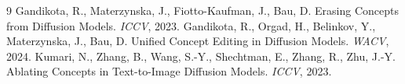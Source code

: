 \documentclass[10pt,twocolumn]{article}
\begin{document}
\begin{thebibliography}{9}
\small
\setlength{\itemsep}{0pt}
\setlength{\parskip}{0pt}
 Gandikota, R., Materzynska, J., Fiotto-Kaufman, J., Bau, D. Erasing Concepts from Diffusion Models. \emph{ICCV}, 2023.
 Gandikota, R., Orgad, H., Belinkov, Y., Materzynska, J., Bau, D. Unified Concept Editing in Diffusion Models. \emph{WACV}, 2024.
 Kumari, N., Zhang, B., Wang, S.-Y., Shechtman, E., Zhang, R., Zhu, J.-Y. Ablating Concepts in Text-to-Image Diffusion Models. \emph{ICCV}, 2023.
\end{thebibliography}
\end{document}
